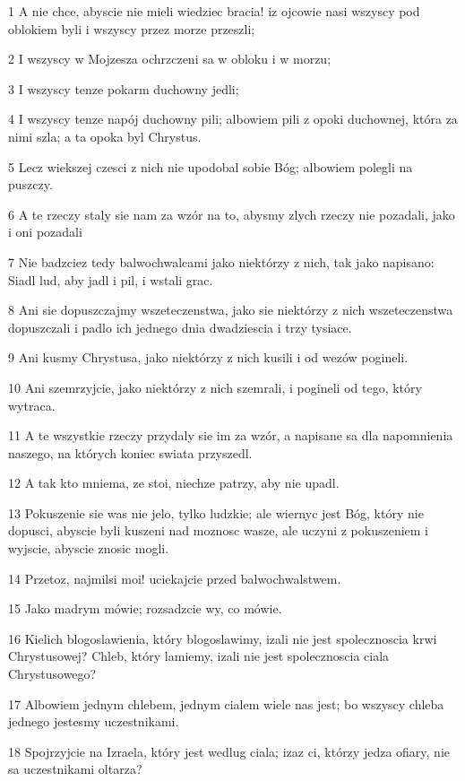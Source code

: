 \par 1 A nie chce, abyscie nie mieli wiedziec bracia! iz ojcowie nasi wszyscy pod oblokiem byli i wszyscy przez morze przeszli;
\par 2 I wszyscy w Mojzesza ochrzczeni sa w obloku i w morzu;
\par 3 I wszyscy tenze pokarm duchowny jedli;
\par 4 I wszyscy tenze napój duchowny pili; albowiem pili z opoki duchownej, która za nimi szla; a ta opoka byl Chrystus.
\par 5 Lecz wiekszej czesci z nich nie upodobal sobie Bóg; albowiem polegli na puszczy.
\par 6 A te rzeczy staly sie nam za wzór na to, abysmy zlych rzeczy nie pozadali, jako i oni pozadali
\par 7 Nie badzciez tedy balwochwalcami jako niektórzy z nich, tak jako napisano: Siadl lud, aby jadl i pil, i wstali grac.
\par 8 Ani sie dopuszczajmy wszeteczenstwa, jako sie niektórzy z nich wszeteczenstwa dopuszczali i padlo ich jednego dnia dwadziescia i trzy tysiace.
\par 9 Ani kusmy Chrystusa, jako niektórzy z nich kusili i od wezów pogineli.
\par 10 Ani szemrzyjcie, jako niektórzy z nich szemrali, i pogineli od tego, który wytraca.
\par 11 A te wszystkie rzeczy przydaly sie im za wzór, a napisane sa dla napomnienia naszego, na których koniec swiata przyszedl.
\par 12 A tak kto mniema, ze stoi, niechze patrzy, aby nie upadl.
\par 13 Pokuszenie sie was nie jelo, tylko ludzkie; ale wiernyc jest Bóg, który nie dopusci, abyscie byli kuszeni nad moznosc wasze, ale uczyni z pokuszeniem i wyjscie, abyscie znosic mogli.
\par 14 Przetoz, najmilsi moi! uciekajcie przed balwochwalstwem.
\par 15 Jako madrym mówie; rozsadzcie wy, co mówie.
\par 16 Kielich blogoslawienia, który blogoslawimy, izali nie jest spolecznoscia krwi Chrystusowej? Chleb, który lamiemy, izali nie jest spolecznoscia ciala Chrystusowego?
\par 17 Albowiem jednym chlebem, jednym cialem wiele nas jest; bo wszyscy chleba jednego jestesmy uczestnikami.
\par 18 Spojrzyjcie na Izraela, który jest wedlug ciala; izaz ci, którzy jedza ofiary, nie sa uczestnikami oltarza?
